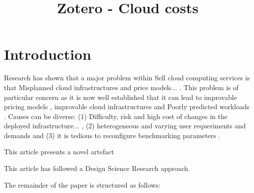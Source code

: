 \documentclass{article}
\title{Zotero - Cloud costs}
\author{}
\begin{document}
\maketitle
      

\section{Introduction}


    
Research has shown that a major problem within Sell cloud computing services is that Misplanned cloud infrastructures and price models... \cite{Calheiros2011}. This problem is of particular concern as it is now well established that it can lead to improvable pricing models \cite{DevelopingUser} \cite{DevelopingUser}, improvable cloud infrastructures and Poorly predicted workloads \cite{Chi2017}. Causes can be diverse: (1) Difficulty, risk and high cost of changes in the deployed infrastructure... \cite{Calheiros2011} \cite{Calheiros2011} \cite{Chi2017}, (2) heterogeneous and varying user requeriments and demands \cite{Calheiros2011} \cite{Calheiros2011} and (3) it is tedious to reconfigure benchmarking parameters \cite{Calheiros2011}. 
    

    

    
This article presents a novel artefact
    

    

      
This article has followed a Design Science Research approach.

The remainder of the paper is structured as follows: 

    
      


\end{document}
